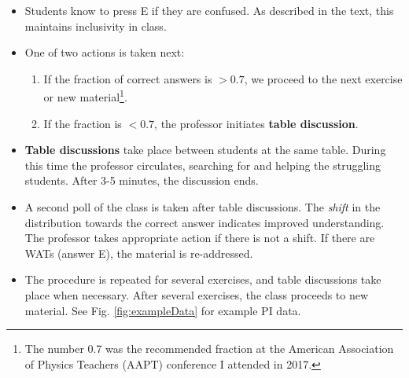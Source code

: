 \documentclass[../../../main.tex]{subfiles}
\begin{document}
\begin{itemize}
\begin{figure}
\end{figure}
\item Students know to press E if they are confused.  As described in the text, this maintains inclusivity in class.
\item One of two actions is taken next:
\begin{enumerate}
\item If the fraction of correct answers is $>0.7$, we proceed to the next exercise or new material\footnote{The number 0.7 was the recommended fraction at the American Association of Physics Teachers (AAPT) conference I attended in 2017.}.
\item If the fraction is $<0.7$, the professor initiates \textbf{table discussion}.
\end{enumerate}
\item \textbf{Table discussions} take place between students at the same table.  During this time the professor circulates, searching for and helping the struggling students.  After 3-5 minutes, the discussion ends.
\item A second poll of the class is taken after table discussions.  The \textit{shift} in the distribution towards the correct answer indicates improved understanding.  The professor takes appropriate action if there is not a shift.  If there are WATs (answer E), the material is re-addressed.
\item The procedure is repeated for several exercises, and table discussions take place when necessary.  After several exercises, the class proceeds to new material. See Fig. \ref{fig:exampleData} for example PI data.
\end{itemize}
\end{document}
